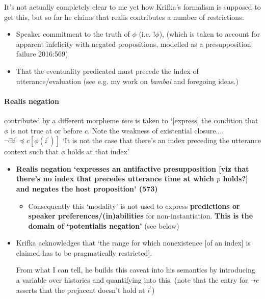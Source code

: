 \documentclass[10pt]{article}
\begin{document}
{\color{ochre} It's not actually completely clear to me yet how Krifka's formalism is supposed to get this, but so far he claims that realis contributes a number of restrictions:
	
	\begin{itemize}
		\item Speaker commitment to the truth of $\phi$ (i.e. $!\phi$), (which is taken to account for apparent infelicity with negated propositions, modelled as a presupposition failure 2016:569)
		\item That the eventuality predicated must precede the index of utterance/evaluation (see e.g. my work on \textit{bambai} and foregoing ideas.)
	
	\end{itemize}

\paragraph{Realis negation} contributed by a different morpheme \textit{tere} is taken to `[express] the condition that $\phi$ is not true at or before $c$. Note the weakness of existential closure.... $\neg\exists i^\prime\preceq c[\phi(i^\prime)]$ `It is not the case that there's an index preceding the utterance context such that $\phi$ holds at that index'

	}
	\begin{itemize}
		\item \textbf{Realis negation `expresses an antifactive presupposition {\color{ochre}[viz that there's no index that precedes utterance time at which $p$ holds?]} and negates the host proposition' (573)}
		
			\begin{itemize}
				\item Consequently this `modality' is not used to express \textbf{predictions or speaker preferences/(in)abilities} for non-instantiation. \textbf{This is the domain of `potentialis negation'} (see below)
			\end{itemize}
		
		\item Krifka acknowledges that `the range for which nonexistence [of an index] is claimed has to be pragmatically restricted]. 
		
		From what I can tell, he builds this caveat into his semantics by introducing a variable over histories and quantifying into this. (note that the entry for \textit{-re} asserts that the prejacent doesn't hold at $i^\prime$)
	\end{itemize}
	
\end{document}
